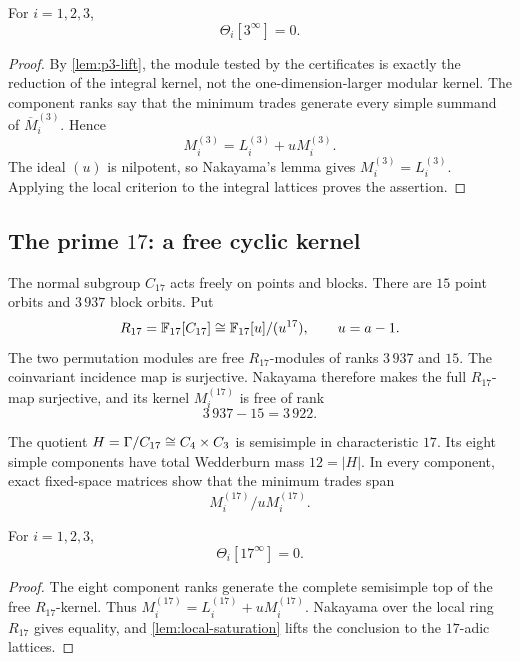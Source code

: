 \begin{proposition}
\label{prop:p3}
For \(i=1,2,3\),
\[
  \Theta_i[3^\infty]=0.
\]
\end{proposition}

\begin{proof}
By \cref{lem:p3-lift}, the module tested by the certificates is exactly
the reduction of the integral kernel, not the one-dimension-larger
modular kernel.  The component ranks say that the minimum trades generate
every simple summand of \(\overline M_i^{(3)}\).  Hence
\[
  M_i^{(3)}=L_i^{(3)}+uM_i^{(3)}.
\]
The ideal \((u)\) is nilpotent, so Nakayama's lemma gives
\(M_i^{(3)}=L_i^{(3)}\).  Applying the local criterion to the integral
lattices proves the assertion.
\end{proof}

\subsection{The prime \(17\): a free cyclic kernel}

The normal subgroup \(C_{17}\) acts freely on points and blocks.  There
are \(15\) point orbits and \(3\,937\) block orbits.  Put
\[
 R_{17}=\mathbb F_{17}[C_{17}]
       \cong\mathbb F_{17}[u]/(u^{17}),\qquad u=a-1.
\]
The two permutation modules are free \(R_{17}\)-modules of ranks
\(3\,937\) and \(15\).  The coinvariant incidence map is surjective.
Nakayama therefore makes the full \(R_{17}\)-map surjective, and its
kernel \(M_i^{(17)}\) is free of rank
\[
 3\,937-15=3\,922.
\]

The quotient \(H=\Gamma/C_{17}\cong C_4\times C_3\) is semisimple in
characteristic \(17\).  Its eight simple components have total Wedderburn
mass \(12=|H|\).  In every component, exact fixed-space matrices show
that the minimum trades span
\[
 M_i^{(17)}/uM_i^{(17)}.
\]

\begin{proposition}
\label{prop:p17}
For \(i=1,2,3\),
\[
  \Theta_i[17^\infty]=0.
\]
\end{proposition}

\begin{proof}
The eight component ranks generate the complete semisimple top of the free
\(R_{17}\)-kernel.  Thus
\(M_i^{(17)}=L_i^{(17)}+uM_i^{(17)}\).  Nakayama over the local ring
\(R_{17}\) gives equality, and \cref{lem:local-saturation} lifts the
conclusion to the \(17\)-adic lattices.
\end{proof}

